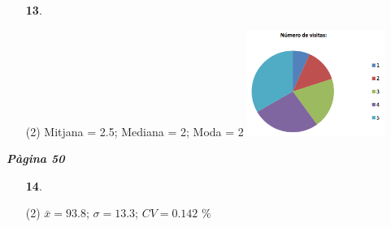 \documentclass[a4paper, pdf, twoside]{book}
\begin{document}
\begin{multicols}{2}
\begin{enumerate}

 \item[\fontfamily{phv}\selectfont\color{blue}\textbf{13}. ] 
 \begin{tasks}[column-sep=1em, item-indent=1.3333em](2)
	 \task* Mitjana = 2.5; Mediana = 2; Moda = 2
	 \task* \includegraphics [width=0.35\textwidth ]{img-sol/t4-13}\par {}
\end{tasks}
 \end{enumerate}
\vspace{0.3cm}


{\textbf{\em Pàgina 50}} \hrulefill
\begin{enumerate}
\vspace{0.25cm}



 \item[\fontfamily{phv}\selectfont\color{blue}\textbf{14}. ] 
 \begin{tasks}[column-sep=1em, item-indent=1.3333em](2)
	 \task* $\bar x=93.8$; $\sigma =13.3$; $CV=0.142$
	  \% \par {}
\end{tasks}
 \end{enumerate}
\begin{enumerate}
\vspace{0.25cm}




\end{enumerate}
\end{multicols}
\end{document}
